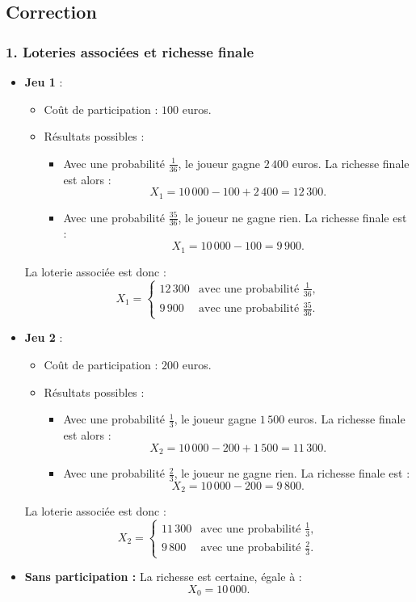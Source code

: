 \documentclass[12pt,a4paper]{article}
\begin{document}
	\subsection{Correction}
	\subsubsection*{1. Loteries associées et richesse finale}
	
	\begin{itemize}
		\item \textbf{Jeu 1} : 
		\begin{itemize}
			\item Coût de participation : \(100\) euros.
			\item Résultats possibles :
			\begin{itemize}
				\item Avec une probabilité \(\frac{1}{36}\), le joueur gagne \(2\,400\) euros. La richesse finale est alors :
				\[
				X_1 = 10\,000 - 100 + 2\,400 = 12\,300.
				\]
				\item Avec une probabilité \(\frac{35}{36}\), le joueur ne gagne rien. La richesse finale est :
				\[
				X_1 = 10\,000 - 100 = 9\,900.
				\]
			\end{itemize}
		\end{itemize}
		La loterie associée est donc :
		\[
		X_1 = 
		\begin{cases} 
			12\,300 & \text{avec une probabilité } \frac{1}{36}, \\
			9\,900 & \text{avec une probabilité } \frac{35}{36}.
		\end{cases}
		\]
		
		\item \textbf{Jeu 2} : 
		\begin{itemize}
			\item Coût de participation : \(200\) euros.
			\item Résultats possibles :
			\begin{itemize}
				\item Avec une probabilité \(\frac{1}{3}\), le joueur gagne \(1\,500\) euros. La richesse finale est alors :
				\[
				X_2 = 10\,000 - 200 + 1\,500 = 11\,300.
				\]
				\item Avec une probabilité \(\frac{2}{3}\), le joueur ne gagne rien. La richesse finale est :
				\[
				X_2 = 10\,000 - 200 = 9\,800.
				\]
			\end{itemize}
		\end{itemize}
		La loterie associée est donc :
		\[
		X_2 = 
		\begin{cases} 
			11\,300 & \text{avec une probabilité } \frac{1}{3}, \\
			9\,800 & \text{avec une probabilité } \frac{2}{3}.
		\end{cases}
		\]
		
		\item \textbf{Sans participation :} La richesse est certaine, égale à :
		\[
		X_0 = 10\,000.
		\]
	\end{itemize}
	
\end{document}
